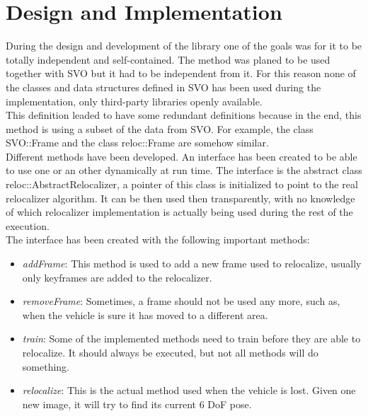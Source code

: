 
\chapter{Design and Implementation}
\label{cha:design_and_implementation}

During the design and development of the  library one of the goals was for it to be totally independent and self-contained. The method was planed to be used together with SVO but it had to be independent from it. For this reason none of the classes and data structures defined in SVO has been used during the implementation, only third-party libraries openly available.\\

This definition leaded to have some redundant definitions because in the end, this method is using a subset of the data from SVO. For example, the class SVO::Frame and the class reloc::Frame are somehow similar.\\

Different methods have been developed. An interface has been created to be able to use one or an other dynamically at run time. The interface is the abstract class reloc::AbstractRelocalizer, a pointer of this class is initialized to point to the real relocalizer algorithm. It can be then used then transparently, with no knowledge of which relocalizer implementation is actually being used during the rest of the execution.\\

The interface has been created with the following important methods:

\begin{itemize}
  \item \textit{addFrame}: This method is used to add a new frame used to relocalize, usually only keyframes are added to the relocalizer.
 
  \item \textit{removeFrame}:  Sometimes, a frame should not be used any more, such as, when the vehicle is sure it has moved to a different area.

  \item \textit{train}: Some of the implemented methods need to train before they are able to relocalize. It should always be executed, but not all methods will do something.

  \item \textit{relocalize}: This is the actual method used when the vehicle is lost. Given one new image, it will try to find its current 6 DoF pose.
\end{itemize}

